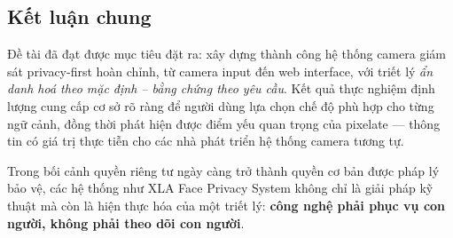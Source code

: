 \medskip

\subsection{Kết luận chung}
\label{subsec:ketluanchung}

Đề tài đã đạt được mục tiêu đặt ra: xây dựng thành công hệ thống camera giám sát privacy-first hoàn chỉnh, từ camera input đến web interface, với triết lý \textit{ẩn danh hoá theo mặc định -- bằng chứng theo yêu cầu}. Kết quả thực nghiệm định lượng cung cấp cơ sở rõ ràng để người dùng lựa chọn chế độ phù hợp cho từng ngữ cảnh, đồng thời phát hiện được điểm yếu quan trọng của pixelate --- thông tin có giá trị thực tiễn cho các nhà phát triển hệ thống camera tương tự.

\medskip
Trong bối cảnh quyền riêng tư ngày càng trở thành quyền cơ bản được pháp lý bảo vệ, các hệ thống như XLA Face Privacy System không chỉ là giải pháp kỹ thuật mà còn là hiện thực hóa của một triết lý: \textbf{công nghệ phải phục vụ con người, không phải theo dõi con người}.

\medskip
